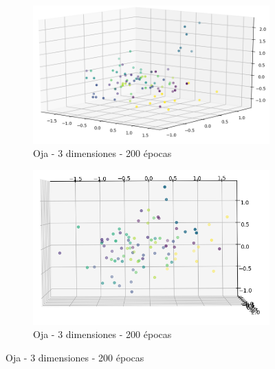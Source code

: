 \begin{figure}[!htbp]
\centering
\begin{subfigure}{.5\textwidth}
  \centering
  \includegraphics[width=1\linewidth, scale=1]{../img/ej1/oja/oja_3salida_100ep_validation.png}
  \caption{Oja - 3 dimensiones - 200 épocas}
  \label{fig:sub1}
\end{subfigure}%
\begin{subfigure}{.5\textwidth}
  \centering
  \includegraphics[width=1\linewidth, scale=1]{../img/ej1/oja/oja_3salida_100ep_validation_3.png}
  \caption{Oja - 3 dimensiones - 200 épocas}
  \label{fig:sub2}
\end{subfigure}
\end{figure}

